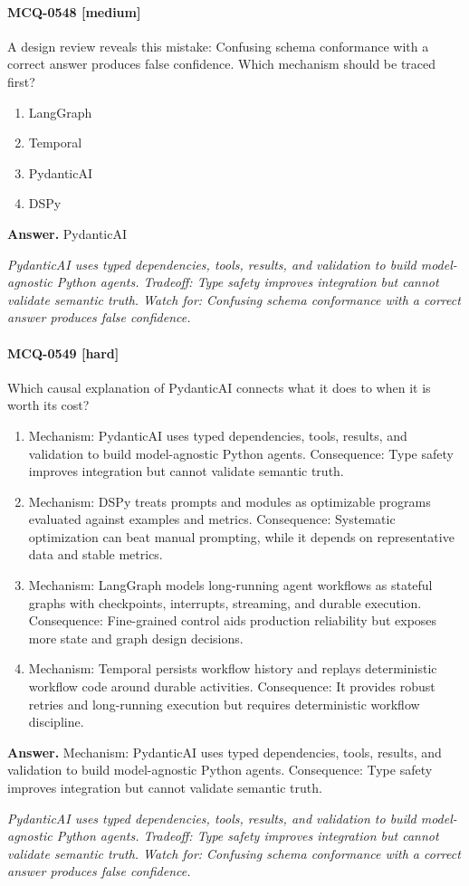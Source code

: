 \paragraph{MCQ-0548 [medium]} A design review reveals this mistake: Confusing schema conformance with a correct answer produces false confidence. Which mechanism should be traced first?
\begin{enumerate}[label=\Alph*.]
\item LangGraph
\item Temporal
\item PydanticAI
\item DSPy
\end{enumerate}
\noindent\textbf{Answer.} PydanticAI
\par\textit{PydanticAI uses typed dependencies, tools, results, and validation to build model-agnostic Python agents. Tradeoff: Type safety improves integration but cannot validate semantic truth. Watch for: Confusing schema conformance with a correct answer produces false confidence.}
\paragraph{MCQ-0549 [hard]} Which causal explanation of PydanticAI connects what it does to when it is worth its cost?
\begin{enumerate}[label=\Alph*.]
\item Mechanism: PydanticAI uses typed dependencies, tools, results, and validation to build model-agnostic Python agents. Consequence: Type safety improves integration but cannot validate semantic truth.
\item Mechanism: DSPy treats prompts and modules as optimizable programs evaluated against examples and metrics. Consequence: Systematic optimization can beat manual prompting, while it depends on representative data and stable metrics.
\item Mechanism: LangGraph models long-running agent workflows as stateful graphs with checkpoints, interrupts, streaming, and durable execution. Consequence: Fine-grained control aids production reliability but exposes more state and graph design decisions.
\item Mechanism: Temporal persists workflow history and replays deterministic workflow code around durable activities. Consequence: It provides robust retries and long-running execution but requires deterministic workflow discipline.
\end{enumerate}
\noindent\textbf{Answer.} Mechanism: PydanticAI uses typed dependencies, tools, results, and validation to build model-agnostic Python agents. Consequence: Type safety improves integration but cannot validate semantic truth.
\par\textit{PydanticAI uses typed dependencies, tools, results, and validation to build model-agnostic Python agents. Tradeoff: Type safety improves integration but cannot validate semantic truth. Watch for: Confusing schema conformance with a correct answer produces false confidence.}
